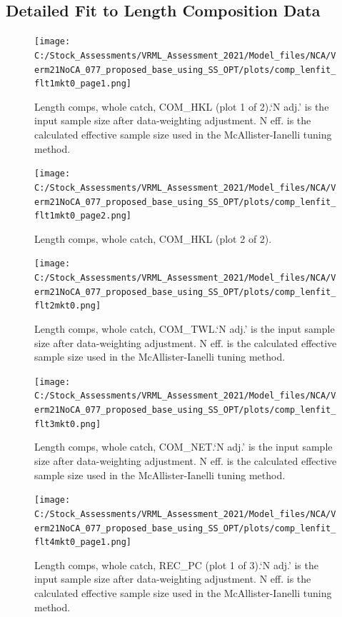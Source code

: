 \documentclass[
  english,
  a4paper,
]{article}
\begin{document}
\hypertarget{append-fit}{%
\subsection{Detailed Fit to Length Composition Data}\label{append-fit}}

\begin{figure}
\centering
\texttt{[image: C:/Stock\_Assessments/VRML\_Assessment\_2021/Model\_files/NCA/Verm21NoCA\_077\_proposed\_base\_using\_SS\_OPT/plots/comp\_lenfit\_flt1mkt0\_page1.png]}
\caption{Length comps, whole catch, COM\_HKL (plot 1 of 2).`N adj.' is the input sample size after data-weighting adjustment. N eff. is the calculated effective sample size used in the McAllister-Ianelli tuning method.\label{fig:comp_lenfit_flt1mkt0_page1}}
\end{figure}

\begin{figure}
\centering
\texttt{[image: C:/Stock\_Assessments/VRML\_Assessment\_2021/Model\_files/NCA/Verm21NoCA\_077\_proposed\_base\_using\_SS\_OPT/plots/comp\_lenfit\_flt1mkt0\_page2.png]}
\caption{Length comps, whole catch, COM\_HKL (plot 2 of 2).\label{fig:comp_lenfit_flt1mkt0_page2}}
\end{figure}

\begin{figure}
\centering
\texttt{[image: C:/Stock\_Assessments/VRML\_Assessment\_2021/Model\_files/NCA/Verm21NoCA\_077\_proposed\_base\_using\_SS\_OPT/plots/comp\_lenfit\_flt2mkt0.png]}
\caption{Length comps, whole catch, COM\_TWL.`N adj.' is the input sample size after data-weighting adjustment. N eff. is the calculated effective sample size used in the McAllister-Ianelli tuning method.\label{fig:comp_lenfit_flt2mkt0}}
\end{figure}

\begin{figure}
\centering
\texttt{[image: C:/Stock\_Assessments/VRML\_Assessment\_2021/Model\_files/NCA/Verm21NoCA\_077\_proposed\_base\_using\_SS\_OPT/plots/comp\_lenfit\_flt3mkt0.png]}
\caption{Length comps, whole catch, COM\_NET.`N adj.' is the input sample size after data-weighting adjustment. N eff. is the calculated effective sample size used in the McAllister-Ianelli tuning method.\label{fig:comp_lenfit_flt3mkt0}}
\end{figure}

\begin{figure}
\centering
\texttt{[image: C:/Stock\_Assessments/VRML\_Assessment\_2021/Model\_files/NCA/Verm21NoCA\_077\_proposed\_base\_using\_SS\_OPT/plots/comp\_lenfit\_flt4mkt0\_page1.png]}
\caption{Length comps, whole catch, REC\_PC (plot 1 of 3).`N adj.' is the input sample size after data-weighting adjustment. N eff. is the calculated effective sample size used in the McAllister-Ianelli tuning method.\label{fig:comp_lenfit_flt4mkt0_page1}}
\end{figure}
\end{document}
